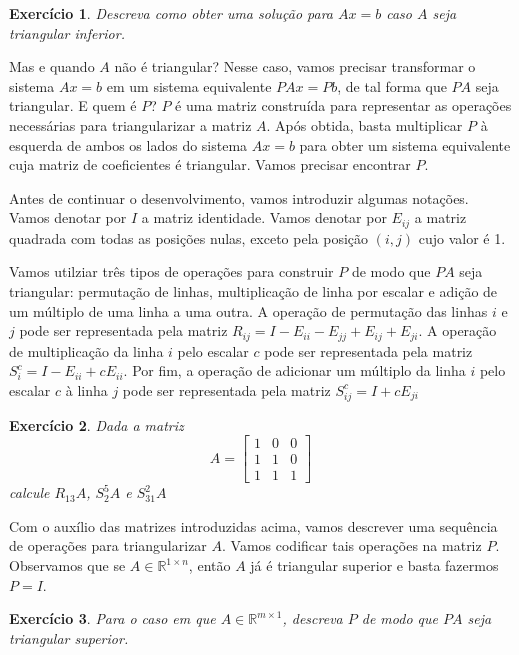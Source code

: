 \documentclass[]{article}
\newtheorem{exercicio}{Exercício}
\numberwithin{equation}{section}
\begin{document}
\begin{exercicio}
	Descreva como obter uma solução para $Ax = b$ caso $A$ seja triangular inferior.
\end{exercicio}

Mas e quando $A$ não é triangular? Nesse caso, vamos precisar transformar o sistema $Ax = b$ em um sistema equivalente $PAx = Pb$, de tal forma que $PA$ seja triangular. E quem é $P$? $P$ é uma matriz construída para representar as operações necessárias para triangularizar a matriz $A$. Após obtida, basta multiplicar $P$ à esquerda de ambos os lados do sistema $Ax = b$ para obter um sistema equivalente cuja matriz de coeficientes é triangular. Vamos precisar encontrar $P$.

Antes de continuar o desenvolvimento, vamos introduzir algumas notações. Vamos denotar por $I$ a matriz identidade. Vamos denotar por $E_{ij}$ a matriz quadrada com todas as posições nulas, exceto pela posição $(i, j)$ cujo valor é 1.

Vamos utilziar três tipos de operações para construir $P$ de modo que $PA$ seja triangular: permutação de linhas, multiplicação de linha por escalar e adição de um múltiplo de uma linha a uma outra. A operação de permutação das linhas $i$ e $j$ pode ser representada pela matriz $R_{ij} = I - E_{ii} - E_{jj} + E_{ij} + E_{ji}$. A operação de multiplicação da linha $i$ pelo escalar $c$ pode ser representada pela matriz $S_i^c = I - E_{ii} + cE_{ii}$. Por fim, a operação de adicionar um múltiplo da linha $i$ pelo escalar $c$ à linha $j$ pode ser representada pela matriz $S_{ij}^c = I + cE_{ji}$

\begin{exercicio}
	Dada a matriz
	$$
	A =
	\begin{bmatrix}
	1 & 0 & 0 \\
	1 & 1 & 0 \\
	1 & 1 & 1
	\end{bmatrix}
	$$
	calcule $R_{13} A$, $S_2^5 A$ e $S_{31}^2 A$
\end{exercicio}

Com o auxílio das matrizes introduzidas acima, vamos descrever uma sequência de operações para triangularizar $A$. Vamos codificar tais operações na matriz $P$. Observamos que se $A \in \mathbb{R}^{1 \times n}$, então $A$ já é triangular superior e basta fazermos $P = I$.

\begin{exercicio}
	Para o caso em que $A \in \mathbb{R}^{m \times 1}$, descreva $P$ de modo que $PA$ seja triangular superior.
\end{exercicio}
\end{document}
